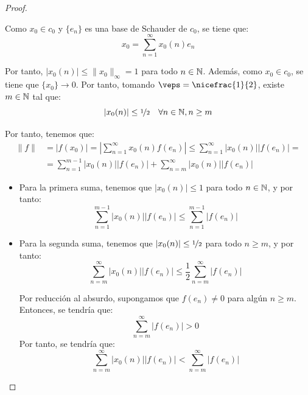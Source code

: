 \begin{ejercicio}
\begin{proof}
\begin{description}
        Como $x_0 \in c_0$ y $\{e_n\}$ es una base de Schauder de $c_0$, se tiene que:
        \begin{equation*}
            x_0 = \sum_{n=1}^{\infty} x_0(n) e_n
        \end{equation*}

        Por tanto, $|x_0(n)|\leq \|x_0\|_\infty = 1$ para todo $n \in \mathbb{N}$. Además, como $x_0 \in c_0$, se tiene que $\{x_0\}\to 0$. Por tanto, tomando $\veps=\nicefrac{1}{2}$, existe $m \in \mathbb{N}$ tal que:
        \begin{equation*}
            |x_0(n)| \leq \nicefrac{1}{2} \quad \forall n \in \mathbb{N}, n \geq m
        \end{equation*}

        Por tanto, tenemos que:
        \begin{align*}
            \|f\| &= |f(x_0)| = \left|\sum_{n=1}^{\infty} x_0(n) f(e_n)\right| \leq \sum_{n=1}^{\infty} |x_0(n)| |f(e_n)|
            =\\&= \sum_{n=1}^{m-1} |x_0(n)| |f(e_n)| + \sum_{n=m}^{\infty} |x_0(n)| |f(e_n)|
        \end{align*}
        \begin{itemize}
            \item Para la primera suma, tenemos que $|x_0(n)| \leq 1$ para todo $n\in \mathbb{N}$, y por tanto:
            \begin{equation*}
                \sum_{n=1}^{m-1} |x_0(n)| |f(e_n)| \leq \sum_{n=1}^{m-1} |f(e_n)|
            \end{equation*}
            \item Para la segunda suma, tenemos que $|x_0(n)| \leq \nicefrac{1}{2}$ para todo $n \geq m$, y por tanto:
            \begin{equation*}
                \sum_{n=m}^{\infty} |x_0(n)| |f(e_n)| \leq \frac{1}{2} \sum_{n=m}^{\infty} |f(e_n)|
            \end{equation*}
            
            Por reducción al absurdo, supongamos que $f(e_n) \neq 0$ para algún $n \geq m$. Entonces, se tendría que:
            \begin{equation*}
                \sum_{n=m}^{\infty} |f(e_n)| > 0
            \end{equation*}
            Por tanto, se tendría que:
            \begin{equation*}
                \sum_{n=m}^{\infty} |x_0(n)| |f(e_n)| < \sum_{n=m}^{\infty} |f(e_n)|
            \end{equation*}
        \end{itemize}


\end{description}
\end{proof}
\end{ejercicio}
